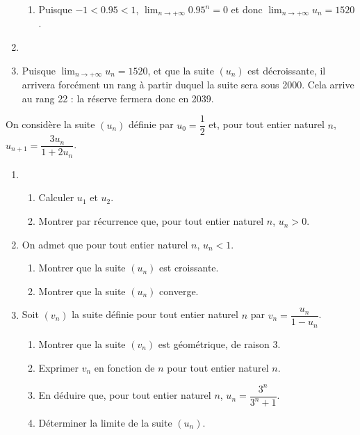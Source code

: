 \documentclass[11pt,fleqn, openany]{book} %
\begin{document}
\begin{solution}
\begin{enumerate}
\begin{enumerate}
 \item Puisque $-1<0.95<1$, $\displaystyle\lim_{n \to + \infty}0.95^n=0$ et donc $\displaystyle\lim_{n \to + \infty}u_n=1520$.\end{enumerate}
\item  



 \item Puisque $\displaystyle\lim_{n \to + \infty}u_n=1520$, et que la suite $(u_n)$ est décroissante, il arrivera forcément un rang à partir duquel la suite sera sous 2000. Cela arrive au rang 22 : la réserve fermera donc en 2039.\end{enumerate}\end{solution}
 
 
 
 

\begin{exercise}[topic=lim14, subtitle={(Polynésie 2013)}]
On considère la suite $(u_n)$ définie par $u_0=\dfrac{1}{2}$ et, pour tout entier naturel $n$, $u_{n+1}=\dfrac{3u_n}{1+2u_n}$.

\begin{enumerate}
\item \begin{enumerate}
\item Calculer $u_1$ et $u_2$.
\item Montrer par récurrence que, pour tout entier naturel $n$, $u_n >0$.
\end{enumerate}
\item On admet que pour tout entier naturel $n$, $u_n <1$.
\begin{enumerate}
\item Montrer que la suite $(u_n)$ est croissante.
\item Montrer que la suite $(u_n)$ converge.
\end{enumerate}
\item Soit $(v_n)$ la suite définie pour tout entier naturel $n$ par $v_n=\dfrac{u_n}{1-u_n}$.
\begin{enumerate}
\item Montrer que la suite $(v_n)$ est géométrique, de raison 3.
\item Exprimer $v_n$ en fonction de $n$ pour tout entier naturel $n$.
\item En déduire que, pour tout entier naturel $n$, $u_n=\dfrac{3^n}{3^n+1}$.
\item Déterminer la limite de la suite $(u_n)$.
\end{enumerate}
\end{enumerate}
\end{exercise}
\end{document}
